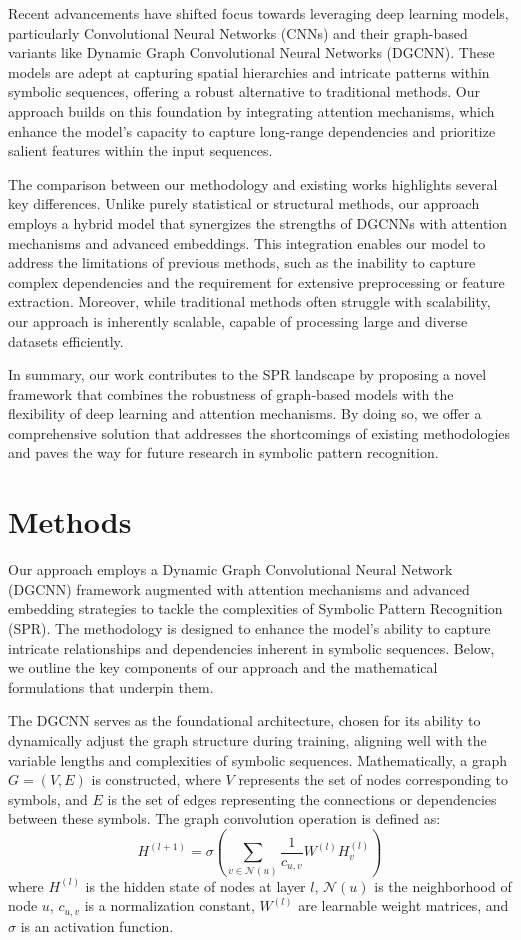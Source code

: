 \documentclass{article}
\begin{document}
Recent advancements have shifted focus towards leveraging deep learning models, particularly Convolutional Neural Networks (CNNs) and their graph-based variants like Dynamic Graph Convolutional Neural Networks (DGCNN). These models are adept at capturing spatial hierarchies and intricate patterns within symbolic sequences, offering a robust alternative to traditional methods. Our approach builds on this foundation by integrating attention mechanisms, which enhance the model's capacity to capture long-range dependencies and prioritize salient features within the input sequences.

The comparison between our methodology and existing works highlights several key differences. Unlike purely statistical or structural methods, our approach employs a hybrid model that synergizes the strengths of DGCNNs with attention mechanisms and advanced embeddings. This integration enables our model to address the limitations of previous methods, such as the inability to capture complex dependencies and the requirement for extensive preprocessing or feature extraction. Moreover, while traditional methods often struggle with scalability, our approach is inherently scalable, capable of processing large and diverse datasets efficiently.

In summary, our work contributes to the SPR landscape by proposing a novel framework that combines the robustness of graph-based models with the flexibility of deep learning and attention mechanisms. By doing so, we offer a comprehensive solution that addresses the shortcomings of existing methodologies and paves the way for future research in symbolic pattern recognition.

\section{Methods}
Our approach employs a Dynamic Graph Convolutional Neural Network (DGCNN) framework augmented with attention mechanisms and advanced embedding strategies to tackle the complexities of Symbolic Pattern Recognition (SPR). The methodology is designed to enhance the model's ability to capture intricate relationships and dependencies inherent in symbolic sequences. Below, we outline the key components of our approach and the mathematical formulations that underpin them.

The DGCNN serves as the foundational architecture, chosen for its ability to dynamically adjust the graph structure during training, aligning well with the variable lengths and complexities of symbolic sequences. Mathematically, a graph \( G = (V, E) \) is constructed, where \( V \) represents the set of nodes corresponding to symbols, and \( E \) is the set of edges representing the connections or dependencies between these symbols. The graph convolution operation is defined as:
\[
H^{(l+1)} = \sigma \left( \sum_{v \in \mathcal{N}(u)} \frac{1}{c_{u,v}} W^{(l)} H_v^{(l)} \right)
\]
where \( H^{(l)} \) is the hidden state of nodes at layer \( l \), \( \mathcal{N}(u) \) is the neighborhood of node \( u \), \( c_{u,v} \) is a normalization constant, \( W^{(l)} \) are learnable weight matrices, and \( \sigma \) is an activation function.
\end{document}
